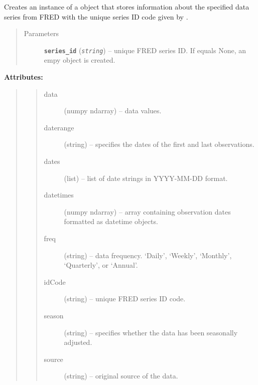 \documentclass[letterpaper,10pt,english]{sphinxmanual}
\begin{document}
\begin{fulllineitems}
\label{series_class:fredpy.series}
Creates an instance of a {\hyperref[series_class:fredpy.series]{}} object that stores information about the specified data series from FRED with the unique series ID code given by .
\begin{quote}\begin{description}
\item[{Parameters}] \leavevmode
\textbf{\texttt{series\_id}} (\emph{\texttt{string}}) -- unique FRED series ID. If  equals None, an empy {\hyperref[series_class:fredpy.series]{}} object is created.

\end{description}\end{quote}

\textbf{Attributes:}
\begin{quote}
\begin{quote}\begin{description}
\item[{data}] \leavevmode
(numpy ndarray) --  data values.

\item[{daterange}] \leavevmode
(string) -- specifies the dates of the first and last observations.

\item[{dates}] \leavevmode
(list) -- list of date strings in YYYY-MM-DD format.

\item[{datetimes}] \leavevmode
(numpy ndarray) -- array containing observation dates formatted as datetime objects.

\item[{freq}] \leavevmode
(string) -- data frequency. `Daily', `Weekly', `Monthly', `Quarterly', or `Annual'.

\item[{idCode}] \leavevmode
(string) -- unique FRED series ID code.

\item[{season}] \leavevmode
(string) -- specifies whether the data has been seasonally adjusted.

\item[{source}] \leavevmode
(string) -- original source of the data.


\end{description}
\end{quote}
\end{quote}
\end{fulllineitems}
\end{document}
